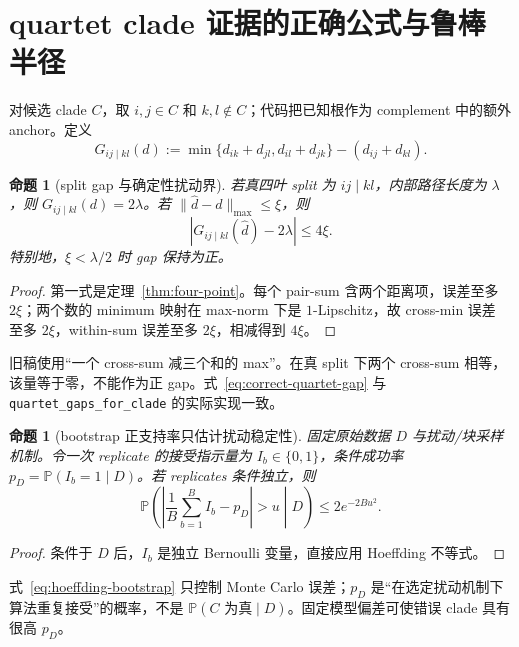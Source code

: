 \documentclass[UTF8,11pt]{ctexart}
\newtheorem{proposition}[definition]{命题}
\newcommand{\Pbb}{\mathbb P}
\begin{document}
\section{quartet clade 证据的正确公式与鲁棒半径}

对候选 clade $C$，取 $i,j\in C$ 和 $k,l\notin C$；代码把已知根作为 complement
中的额外 anchor。定义
\begin{equation}
 G_{ij\mid kl}(d)
 :=\min\{d_{ik}+d_{jl},d_{il}+d_{jk}\}-(d_{ij}+d_{kl}).
 \label{eq:correct-quartet-gap}
\end{equation}

\begin{proposition}[split gap 与确定性扰动界]
\label{prop:quartet-robust}
若真四叶 split 为 $ij\mid kl$，内部路径长度为 $\lambda$，则
$G_{ij\mid kl}(d)=2\lambda$。若
$\|\widehat d-d\|_{\max}\le\xi$，则
\begin{equation}
 |G_{ij\mid kl}(\widehat d)-2\lambda|\le4\xi.
 \label{eq:quartet-error}
\end{equation}
特别地，$\xi<\lambda/2$ 时 gap 保持为正。
\end{proposition}

\begin{proof}
第一式是定理~\ref{thm:four-point}。每个 pair-sum 含两个距离项，误差至多
$2\xi$；两个数的 minimum 映射在 max-norm 下是 $1$-Lipschitz，故 cross-min 误差
至多 $2\xi$，within-sum 误差至多 $2\xi$，相减得到 $4\xi$。
\end{proof}

旧稿使用“一个 cross-sum 减三个和的 max”。在真 split 下两个 cross-sum 相等，
该量等于零，不能作为正 gap。式~\eqref{eq:correct-quartet-gap} 与
\texttt{quartet\_gaps\_for\_clade} 的实际实现一致。

\begin{proposition}[bootstrap 正支持率只估计扰动稳定性]
\label{prop:bootstrap-mc}
固定原始数据 $D$ 与扰动/块采样机制。令一次 replicate 的接受指示量为
$I_b\in\{0,1\}$，条件成功率 $p_D=\Pbb(I_b=1\mid D)$。若 replicates 条件独立，则
\begin{equation}
 \Pbb\left(\left|\frac1B\sum_{b=1}^BI_b-p_D\right|>u\middle|D\right)
 \le2e^{-2Bu^2}.
 \label{eq:hoeffding-bootstrap}
\end{equation}
\end{proposition}

\begin{proof}
条件于 $D$ 后，$I_b$ 是独立 Bernoulli 变量，直接应用 Hoeffding 不等式。
\end{proof}

式~\eqref{eq:hoeffding-bootstrap} 只控制 Monte Carlo 误差；$p_D$ 是“在选定扰动机制下
算法重复接受”的概率，不是 $\Pbb(C\text{ 为真}\mid D)$。固定模型偏差可使错误 clade
具有很高 $p_D$。
\end{document}
